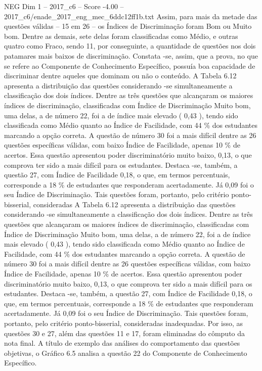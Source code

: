 \begin{textsample}{NEG Dim 1 – 2017\_c6 – Score -4.00 – 2017\_c6/enade\_2017\_eng\_mec\_6ddc12ff1b.txt}
Assim, para mais da metade das questões válidas – 15 em 26 – os Índices de Discriminação foram Bom ou Muito bom.
Dentre as demais, sete delas foram classificadas como Médio, e outras quatro como Fraco, sendo 11, por conseguinte, a quantidade de questões nos dois patamares mais baixos de discriminação.
Constata -se, assim, que a prova, no que se refere ao Componente de Conhecimento Específico, possuía boa capacidade de discriminar dentre aqueles que dominam ou não o conteúdo.
A Tabela 6.12 apresenta a distribuição das questões considerando -se simultaneamente a classificação dos dois índices.
Dentre as três questões que alcançaram os maiores índices de discriminação, classificadas com Índice de Discriminação Muito bom, uma delas, a de número 22, foi a de índice mais elevado ( 0,43 ), tendo sido classificada como Médio quanto ao Índice de Facilidade, com 44 \% dos estudantes marcando a opção correta.
A questão de número 30 foi a mais difícil dentre as 26 questões específicas válidas, com baixo Índice de Facilidade, apenas 10 \% de acertos.
Essa questão apresentou poder discriminatório muito baixo, 0,13, o que comprova ter sido a mais difícil para os estudantes.
Destaca -se, também, a questão 27, com Índice de Facilidade 0,18, o que, em termos percentuais, corresponde a 18 \% de estudantes que responderam acertadamente.
Já 0,09 foi o seu Índice de Discriminação.
Tais questões foram, portanto, pelo critério ponto-bisserial, consideradas A Tabela 6.12 apresenta a distribuição das questões considerando -se simultaneamente a classificação dos dois índices.
Dentre as três questões que alcançaram os maiores índices de discriminação, classificadas com Índice de Discriminação Muito bom, uma delas, a de número 22, foi a de índice mais elevado ( 0,43 ), tendo sido classificada como Médio quanto ao Índice de Facilidade, com 44 \% dos estudantes marcando a opção correta.
A questão de número 30 foi a mais difícil dentre as 26 questões específicas válidas, com baixo Índice de Facilidade, apenas 10 \% de acertos.
Essa questão apresentou poder discriminatório muito baixo, 0,13, o que comprova ter sido a mais difícil para os estudantes.
Destaca -se, também, a questão 27, com Índice de Facilidade 0,18, o que, em termos percentuais, corresponde a 18 \% de estudantes que responderam acertadamente.
Já 0,09 foi o seu Índice de Discriminação.
Tais questões foram, portanto, pelo critério ponto-bisserial, consideradas inadequadas.
Por isso, as questões 30 e 27, além das questões 11 e 17, foram eliminadas do cômputo da nota final.
A título de exemplo das análises do comportamento das questões objetivas, o Gráfico 6.5 analisa a questão 22 do Componente de Conhecimento Específico.

\end{textsample}
